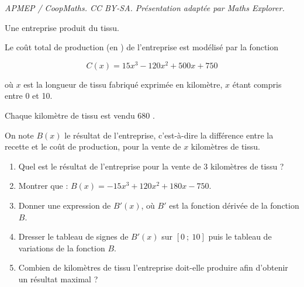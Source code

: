 \documentclass[10pt]{article}
\providecommand{\euro}{\texteuro}
\providecommand{\euro}{{\text{€}}}
\renewcommand{\euro}{\ifmmode\text{\texteuro}\else\texteuro\fi}
\begin{document}
\noindent\textit{APMEP / CoopMaths. CC BY-SA. Présentation adaptée par Maths Explorer.}\par\medskip
\medskip

Une entreprise produit du tissu.

Le coût total de production (en \euro) de l'entreprise est modélisé par la fonction

\[C(x)= 15x^3 - 120x^2 + 500x + 750\] 

où $x$ est la longueur de tissu fabriqué exprimée en kilomètre, $x$ étant compris entre 0 et 10.

Chaque kilomètre de tissu est vendu $680$ \euro.

On note $B(x)$ le résultat de l'entreprise, c’est-à-dire la différence entre la recette et le coût de production, pour la vente de $x$ kilomètres de tissu.

\medskip

\begin{enumerate}
\item Quel est le résultat de l’entreprise pour la vente de 3 kilomètres de tissu ?
\item Montrer que : $B(x)=-15x^3+120x^2+180x-750$.
\item Donner une expression de $B'(x)$, où $B'$ est la fonction dérivée de la fonction $B$.
\item Dresser le tableau de signes de $B'(x)$ sur $[0~;~10]$ puis le tableau de variations de la fonction $B$.
\item Combien de kilomètres de tissu l’entreprise doit-elle produire afin d’obtenir un résultat maximal ?
\end{enumerate}
\end{document}
